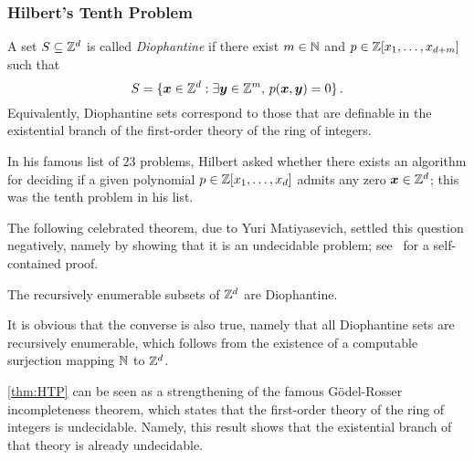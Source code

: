 \subsubsection{Hilbert's Tenth Problem}

A set $S \subseteq \mathbb{Z}^{d}$ is called \emph{Diophantine} if there exist $m \in \mathbb{N}$ and $p \in \mathbb{Z}[x_{1}, \ldots, x_{d+m}]$ such that
\[ S = \lbrace \boldsymbol{x} \in \mathbb{Z}^{d} : \exists \boldsymbol{y} \in \mathbb{Z}^{m}, \, p(\boldsymbol{x}, \boldsymbol{y}) = 0 \rbrace \, . \]
Equivalently, Diophantine sets correspond to those that are definable in the existential branch of the first-order theory of the ring of integers.

In his famous list of 23 problems, Hilbert asked whether there exists an algorithm for deciding if a given polynomial $p \in \mathbb{Z}[x_{1}, \ldots, x_{d}]$ admits any zero $\boldsymbol{x} \in \mathbb{Z}^{d}$; this was the tenth problem in his list.

The following celebrated theorem, due to Yuri Matiyasevich, settled this question negatively, namely by showing that it is an undecidable problem; see~\cite{HTP} for a self-contained proof.

\begin{theorem}[Matiyasevich]
\label{thm:HTP}
The recursively enumerable subsets of $\mathbb{Z}^{d}$ are Diophantine.
\end{theorem}

It is obvious that the converse is also true, namely that all Diophantine sets are recursively enumerable, which follows from the existence of a computable surjection mapping $\mathbb{N}$ to $\mathbb{Z}^{d}$.

\cref{thm:HTP} can be seen as a strengthening of the famous G\"{o}del-Rosser incompleteness theorem, which states that the first-order theory of the ring of integers is undecidable. Namely, this result shows that the existential branch of that theory is already undecidable.
